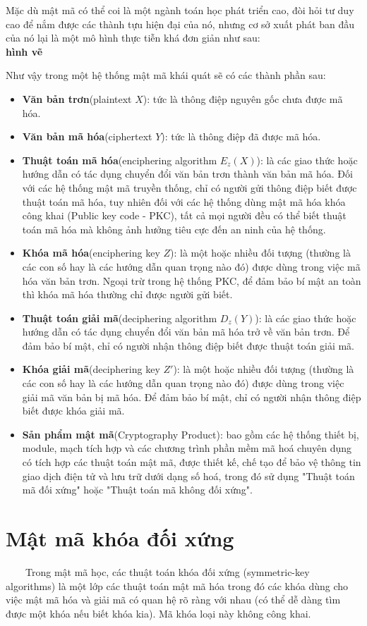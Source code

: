 \documentclass[a4paper,12pt]{report}
\begin{document}
Mặc dù mật mã có thể coi là một ngành toán học phát triển cao, đòi hỏi tư duy
cao để nắm được các thành tựu hiện đại của nó, nhưng cơ sở xuất phát ban đầu của nó lại là một mô hình thực tiễn khá đơn giản như sau:\\
\textbf{hình vẽ}

Như vậy trong một hệ thống mật mã khái quát sẽ có các thành phần sau:
\begin{itemize}
\item \textbf{Văn bản trơn}(plaintext $X$): tức là thông điệp nguyên gốc chưa được mã hóa.
\item \textbf{Văn bản mã hóa}(ciphertext $Y$): tức là thông điệp đã được mã hóa.
\item \textbf{Thuật toán mã hóa}(enciphering algorithm $E_z(X)$): là các giao thức hoặc hướng dẫn có tác dụng chuyển đổi văn bản trơn thành văn bản mã hóa. Đối với các hệ thống mật mã truyền thống, chỉ có người gửi thông điệp biết được thuật toán mã hóa, tuy nhiên đối với các hệ thống dùng mật mã hóa khóa công khai (Public key code - PKC), tất cả mọi người đều có thể biết thuật toán mã hóa mà không ảnh hưởng tiêu cực đến an ninh của hệ thống.
\item \textbf{Khóa mã hóa}(enciphering key $Z$): là một hoặc nhiều đối tượng (thường là các con số hay là các hướng dẫn quan trọng nào đó) được dùng trong việc mã hóa văn bản trơn. Ngoại trừ trong hệ thống PKC, để đảm bảo bí mật an toàn thì khóa mã hóa thường chỉ được người gửi biết.
\item \textbf{Thuật toán giải mã}(deciphering algorithm $D_z(Y)$): là các giao thức hoặc hướng dẫn có tác dụng chuyển đổi văn bản mã hóa trở về văn bản trơn. Để đảm bảo bí mật, chỉ có người nhận thông điệp biết được thuật toán giải mã.
\item  \textbf{Khóa giải mã}(deciphering key $Z'$): là một hoặc nhiều đối tượng (thường là các con số hay là các hướng dẫn quan trọng nào đó) được dùng trong việc giải mã văn bản bị mã hóa. Để đảm bảo bí mật, chỉ có người nhận thông điệp biết được khóa giải mã.
\item \textbf{Sản phẩm mật mã}(Cryptography Product): bao gồm các hệ thống thiết bị, module, mạch tích hợp và các chương trình phần mềm mã hoá chuyên dụng có tích hợp các thuật toán mật mã, được thiết kế, chế tạo để bảo vệ thông tin giao dịch điện tử và lưu trữ dưới dạng số hoá, trong đó sử dụng "Thuật toán mã đối xứng" hoặc "Thuật toán mã không đối xứng".
\end{itemize}
\section{Mật mã khóa đối xứng}
\ \ \ \ Trong mật mã học, các thuật toán khóa đối xứng (symmetric-key algorithms) là một lớp các thuật toán mật mã hóa trong đó các khóa dùng cho việc mật mã hóa và giải mã có quan hệ rõ ràng với nhau (có thể dễ dàng tìm được một khóa nếu biết khóa kia). Mã khóa loại này không công khai.
\end{document}
